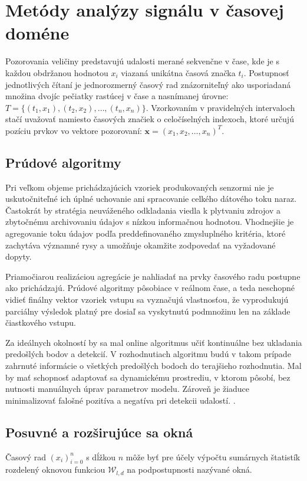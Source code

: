 \section{Metódy analýzy signálu v časovej doméne}
Pozorovania veličiny predstavujú udalosti merané sekvenčne v čase, kde je s každou obdržanou hodnotou $x_i$ viazaná unikátna
časová značka $t_i$. Postupnosť jednotlivých čítaní je jednorozmerný časový rad znázorniteľný ako usporiadaná množina dvojíc pečiatky
rastúcej v čase a nasnímanej úrovne: $T = \{(t_1, x_1),(t_2, x_2), …, (t_n, x_n)\}$. Vzorkovaním v pravidelných intervaloch stačí
uvažovať namiesto časových značiek o celočíselných indexoch, ktoré určujú pozíciu prvkov vo vektore pozorovaní:
$\mathbf{x} = (x_1, x_2, …, x_n)^T$.

\subsection{Prúdové algoritmy}
Pri veľkom objeme prichádzajúcich vzoriek produkovaných senzormi nie je uskutočniteľné ich úplné uchovanie ani spracovanie celkého
dátového toku naraz. Častokrát by stratégia neuváženého odkladania viedla k plytvaniu zdrojov a zbytočnému archivovaniu
údajov s nízkou informačnou hodnotou. Vhodnejšie je agregovanie toku údajov podľa preddefinovaného zmysluplného kritéria,
ktoré zachytáva významné rysy a umožňuje okamžite zodpovedať na vyžadované dopyty.

Priamočiarou realizáciou agregácie je nahliadať na prvky časového radu postupne ako prichádzajú.
Prúdové algoritmy pôsobiace v reálnom čase, a teda neschopné vidieť finálny vektor vzoriek vstupu sa vyznačujú vlastnosťou,
že vyprodukujú parciálny výsledok platný pre dosiaľ sa vyskytnutú podmnožinu len na základe čiastkového vstupu.

Za ideálnych okolností by sa mal online algoritmus učiť kontinuálne bez ukladania predošlých bodov a detekcií.
V rozhodnutiach algoritmu budú v takom prípade zahrnuté informácie o všetkých predošlých bodoch do terajšieho rozhodnutia.
Mal by mať schopnosť adaptovať sa dynamickému prostrediu, v ktorom pôsobí, bez nutnosti manuálnych úprav parametrov modelu.
Zároveň je žiaduce minimalizovať falošné pozitíva a negatíva pri detekcii udalostí. \cite{data-streams}.

\subsection{Posuvné a rozširujúce sa okná}
Časový rad $\left(x_i\right)_{i = 0}^{n}$ s dĺžkou $n$ môže byť pre účely výpočtu sumárnych štatistík rozdelený oknovou funkciou
$\mathcal{W}_{l, d}$ na podpostupnosti nazývané okná.

